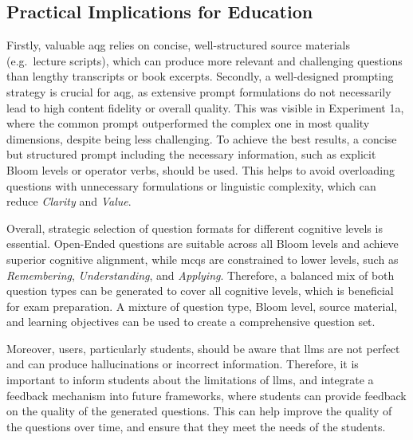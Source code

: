 
\subsection{Practical Implications for Education}

Firstly, valuable \ac{aqg} relies on concise, well-structured source materials (e.g.\ lecture scripts), which can produce more relevant and challenging questions than lengthy transcripts or book excerpts. Secondly, a well-designed prompting strategy is crucial for \ac{aqg}, as extensive prompt formulations do not necessarily lead to high content fidelity or overall quality. This was visible in Experiment 1a, where the common prompt outperformed the complex one in most quality dimensions, despite being less challenging. To achieve the best results, a concise but structured prompt including the necessary information, such as explicit Bloom levels or operator verbs, should be used. This helps to avoid overloading questions with unnecessary formulations or linguistic complexity, which can reduce \textit{Clarity} and \textit{Value}.

Overall, strategic selection of question formats for different cognitive levels is essential. Open-Ended questions are suitable across all Bloom levels and achieve superior cognitive alignment, while \acp{mcq} are constrained to lower levels, such as \textit{Remembering}, \textit{Understanding}, and \textit{Applying}. Therefore, a balanced mix of both question types can be generated to cover all cognitive levels, which is beneficial for exam preparation. A mixture of question type, Bloom level, source material, and learning objectives can be used to create a comprehensive question set.

Moreover, users, particularly students, should be aware that \acp{llm} are not perfect and can produce hallucinations or incorrect information. Therefore, it is important to inform students about the limitations of \acp{llm}, and integrate a feedback mechanism into future frameworks, where students can provide feedback on the quality of the generated questions. This can help improve the quality of the questions over time, and ensure that they meet the needs of the students.

